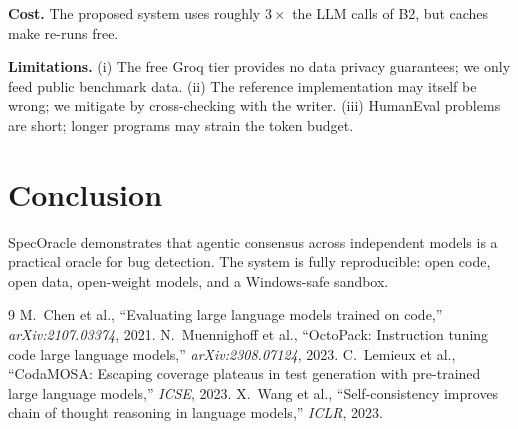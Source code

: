 \documentclass[conference]{IEEEtran}
\begin{document}
\textbf{Cost.} The proposed system uses roughly $3\times$ the LLM calls of B2,
but caches make re-runs free.

\textbf{Limitations.} (i) The free Groq tier provides no data privacy
guarantees; we only feed public benchmark data. (ii) The reference
implementation may itself be wrong; we mitigate by cross-checking with the
writer. (iii) HumanEval problems are short; longer programs may strain the
token budget.

\section{Conclusion}
SpecOracle demonstrates that agentic consensus across independent models is
a practical oracle for bug detection. The system is fully reproducible: open
code, open data, open-weight models, and a Windows-safe sandbox.

\begin{thebibliography}{9}
M.~Chen et al., ``Evaluating large language models trained on code,''
\emph{arXiv:2107.03374}, 2021.
N.~Muennighoff et al., ``OctoPack: Instruction tuning code large language
models,'' \emph{arXiv:2308.07124}, 2023.
C.~Lemieux et al., ``CodaMOSA: Escaping coverage plateaus in test generation
with pre-trained large language models,'' \emph{ICSE}, 2023.
X.~Wang et al., ``Self-consistency improves chain of thought reasoning in
language models,'' \emph{ICLR}, 2023.
\end{thebibliography}
\end{document}
